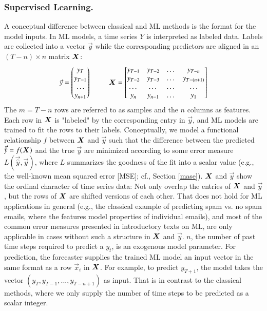 \subsubsection{Supervised Learning.}
\label{learning}

A conceptual difference between classical and ML methods is the format
    for the model inputs.
In ML models, a time series $Y$ is interpreted as labeled data.
Labels are collected into a vector $\vec{y}$ while the corresponding
    predictors are aligned in an $(T - n) \times n$ matrix $\bm{X}$:
$$
\vec{y}
=
\begin{pmatrix}
    y_T \\
    y_{T-1} \\
    \dots \\
    y_{n+1}
\end{pmatrix}
~~~~~~~~~~
\bm{X}
=
\begin{bmatrix}
    y_{T-1} & y_{T-2} & \dots & y_{T-n} \\
    y_{T-2} & y_{T-3} & \dots & y_{T-(n+1)} \\
    \dots   & \dots   & \dots & \dots \\
    y_n     & y_{n-1} & \dots & y_1
\end{bmatrix}
$$
The $m = T - n$ rows are referred to as samples and the $n$ columns as
    features.
Each row in $\bm{X}$ is "labeled" by the corresponding entry in $\vec{y}$,
    and ML models are trained to fit the rows to their labels.
Conceptually, we model a functional relationship $f$ between $\bm{X}$ and
    $\vec{y}$ such that the difference between the predicted
    $\vec{\hat{y}} = f(\bm{X})$ and the true $\vec{y}$ are minimized
    according to some error measure $L(\vec{\hat{y}}, \vec{y})$, where $L$
    summarizes the goodness of the fit into a scalar value (e.g., the
    well-known mean squared error [MSE]; cf., Section \ref{mase}).
$\bm{X}$ and $\vec{y}$ show the ordinal character of time series data:
    Not only overlap the entries of $\bm{X}$ and $\vec{y}$, but the rows of
    $\bm{X}$ are shifted versions of each other.
That does not hold for ML applications in general (e.g., the classical
    example of predicting spam vs. no spam emails, where the features model
    properties of individual emails), and most of the common error measures
    presented in introductory texts on ML, are only applicable in cases
    without such a structure in $\bm{X}$ and $\vec{y}$.
$n$, the number of past time steps required to predict a $y_t$, is an
    exogenous model parameter.
For prediction, the forecaster supplies the trained ML model an input
    vector in the same format as a row $\vec{x}_i$ in $\bm{X}$.
For example, to predict $y_{T+1}$, the model takes the vector
    $(y_T, y_{T-1}, ..., y_{T-n+1})$ as input.
That is in contrast to the classical methods, where we only supply the number
    of time steps to be predicted as a scalar integer.
